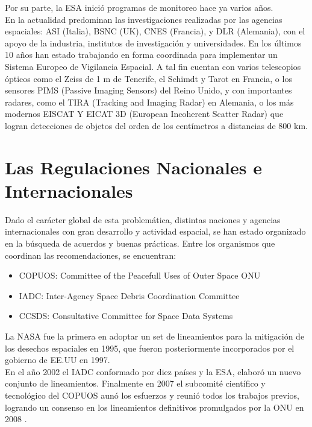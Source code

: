 Por su parte, la ESA inició programas de monitoreo hace ya varios años.\\
En la actualidad predominan las investigaciones realizadas por las agencias espaciales: ASI (Italia), BSNC (UK), CNES (Francia), y DLR (Alemania), con el apoyo de la industria, institutos de investigación y universidades. En los últimos 10 años han estado trabajando en forma coordinada para implementar un Sistema Europeo de Vigilancia Espacial.
A tal fin cuentan con varios telescopios ópticos como el Zeiss de 1 m de Tenerife, el Schimdt y Tarot en Francia, o los sensores PIMS (Passive Imaging Sensors) del Reino Unido, y con importantes radares, como el TIRA (Tracking and Imaging Radar) en Alemania, o los más modernos EISCAT Y EICAT 3D (European Incoherent Scatter Radar) que logran detecciones de objetos del orden de los centímetros a distancias de 800 km.





\section{Las Regulaciones Nacionales e Internacionales}

Dado el car\'acter global de esta problem\'atica, distintas naciones y agencias internacionales con gran desarrollo y actividad espacial, se han estado organizado en la b\'usqueda de acuerdos y buenas pr\'acticas. Entre los organismos que coordinan las recomendaciones, se encuentran:\\

\begin{itemize}
\item COPUOS: Committee of the Peacefull Uses of Outer Space \ac{ONU}
\item IADC: Inter-Agency Space Debris Coordination Committee
\item CCSDS: Consultative Committee for Space Data Systems
\end{itemize}

La NASA fue la primera en adoptar un set de lineamientos para la mitigaci\'on de los desechos espaciales en 1995, que fueron posteriormente incorporados por el gobierno de EE.UU en 1997.\\
En el a\~no 2002 el IADC conformado por diez pa\'ises y la ESA, elabor\'o un nuevo conjunto de lineamientos.
Finalmente en 2007 el subcomit\'e cient\'ifico y tecnol\'ogico del COPUOS aun\'o los esfuerzos y reuni\'o todos los trabajos previos, logrando un consenso en los lineamientos definitivos promulgados por la ONU en 2008 \citep{nasaprogramme}.\\

